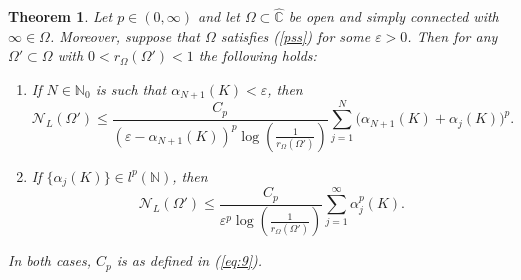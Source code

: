 \documentclass[12pt,a4paper]{article}
\newtheorem{theorem}{Theorem}[section]
\theoremstyle{definition}
\theoremstyle{remark}
\numberwithin{equation}{section}
\newcommand{\mn}{{\mathbb N}}
\newcommand{\mc}{{\mathbb C}}
\renewcommand{\epsilon}{\varepsilon}
\newcommand{\eps}{\epsilon}
\begin{document}
\begin{theorem}\label{thm1}
Let $p \in (0,\infty)$ and let $\Omega \subset \hat{\mc}$ be open and simply connected with $\infty \in \Omega$. Moreover, suppose that $\Omega$ satisfies (\ref{pss}) for some $\eps > 0$. Then for any $\Omega'\subset \Omega$ with $0<r_{\Omega}(\Omega')<1$ the following holds:  
  \begin{enumerate}
      \item[(i)] If $N\in\mathbb{N}_0$ is such that $\alpha_{N+1}(K)<\epsilon $, then 
\begin{equation*}
  \mathcal{N}_L(\Omega') \leq \frac{C_p}{(\epsilon-\alpha_{N+1}(K))^p \log \left(\frac 1 {r_{\Omega}(\Omega')}\right)} \sum_{j=1}^N\Big( \alpha_{N+1}(K) + \alpha_j(K) \Big)^p.
  \end{equation*}
\item[(ii)] If $\{\alpha_j(K)\} \in l^p(\mn)$, then 
\begin{equation*}
  \mathcal{N}_L(\Omega') \leq \frac{C_p}{\eps ^p \log \left(\frac 1 {r_{\Omega}(\Omega')}\right)}  \sum_{j=1}^\infty \alpha_j^p(K)  .
  \end{equation*}
  \end{enumerate}
In both cases, $C_p$ is as defined in (\ref{eq:9}).
\end{theorem}
\end{document}
